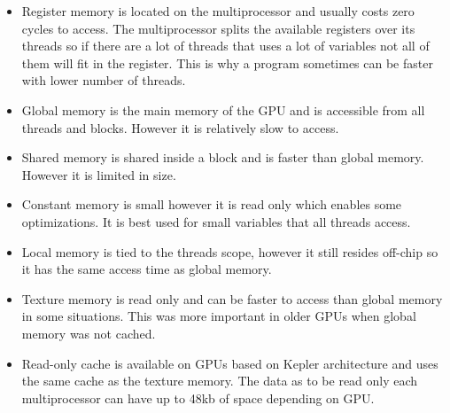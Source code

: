 \documentclass[10pt,a4paper]{report}
\begin{document}
\begin{itemize}
  \item Register memory is located on the multiprocessor and usually costs zero cycles to access. The multiprocessor splits the available registers over its threads so if there are a lot of threads that uses a lot of variables not all of them will fit in the register. This is why a program sometimes can be faster with lower number of threads.\cite{cuda}
  \item Global memory is the main memory of the GPU and is accessible from all threads and blocks. However it is relatively slow to access.\cite{cuda}
  \item Shared memory is shared inside a block and is faster than global memory. However it is limited in size.\cite{cuda}
  \item Constant memory is small however it is read only which enables some optimizations. It is best used for small variables that all threads access.\cite{cuda}
  \item Local memory is tied to the threads scope, however it still resides off-chip so it has the same access time as global memory.\cite{cuda}
  \item Texture memory is read only and can be faster to access than global memory in some situations. This was more important in older GPUs when global memory was not cached.\cite{plink_gpu, cuda}
  \item Read-only cache is available on GPUs based on Kepler architecture and uses the same cache as the texture memory. The data as to be read only each multiprocessor can have up to 48kb of space depending on GPU.\cite{kepler_tuning_guide}
\end{itemize}
\end{document}
